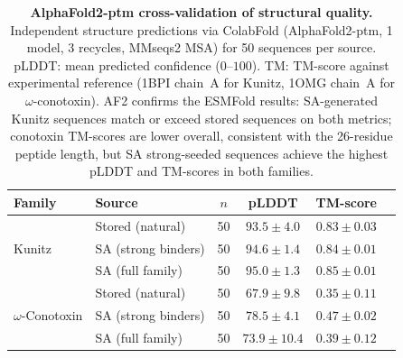 \documentclass[journal=jcisd8,manuscript=article]{achemso}
\theoremstyle{definition}
\theoremstyle{remark}
\begin{document}
\begin{table}[p]
  \centering
  \caption{\textbf{AlphaFold2-ptm cross-validation of structural quality.}
  Independent structure predictions via ColabFold (AlphaFold2-ptm, 1 model,
  3 recycles, MMseqs2 MSA) for 50 sequences per source.
  pLDDT: mean predicted confidence ($0$--$100$).
  TM: TM-score against experimental reference (1BPI chain~A for Kunitz,
  1OMG chain~A for $\omega$-conotoxin).
  AF2 confirms the ESMFold results: SA-generated Kunitz sequences match or
  exceed stored sequences on both metrics; conotoxin TM-scores are lower
  overall, consistent with the 26-residue peptide length, but SA strong-seeded
  sequences achieve the highest pLDDT and TM-scores in both families.}
  \label{tab:af2-validation}
  \small
  \begin{tabular}{llcccc}
    \toprule
    Family & Source & $n$ & pLDDT & TM-score \\
    \midrule
    \multirow{3}{*}{Kunitz}
      & Stored (natural)       & 50 & $93.5 \pm 4.0$ & $0.83 \pm 0.03$ \\
      & SA (strong binders)    & 50 & $94.6 \pm 1.4$ & $0.84 \pm 0.01$ \\
      & SA (full family)       & 50 & $95.0 \pm 1.3$ & $0.85 \pm 0.01$ \\
    \midrule
    \multirow{3}{*}{$\omega$-Conotoxin}
      & Stored (natural)       & 50 & $67.9 \pm 9.8$ & $0.35 \pm 0.11$ \\
      & SA (strong binders)    & 50 & $78.5 \pm 4.1$ & $0.47 \pm 0.02$ \\
      & SA (full family)       & 50 & $73.9 \pm 10.4$ & $0.39 \pm 0.12$ \\
    \bottomrule
  \end{tabular}
\end{table}
\end{document}
